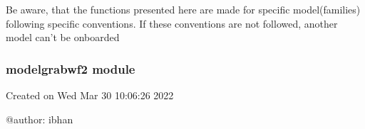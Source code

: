 \documentclass[letterpaper,10pt,english]{sphinxmanual}
\begin{document}
\sphinxAtStartPar
Be aware, that the functions presented here are made for specific model(families) following specific conventions. If these
conventions are not followed, another model can’t be onboarded

\sphinxstepscope


\subsubsection{modelgrabwf2 module}
\label{\detokenize{onboard/modelgrabwf2:module-modelgrabwf2}}\label{\detokenize{onboard/modelgrabwf2:modelgrabwf2-module}}\label{\detokenize{onboard/modelgrabwf2::doc}}
\sphinxAtStartPar
Created on Wed Mar 30 10:06:26 2022

\sphinxAtStartPar
@author: ibhan
\end{document}
